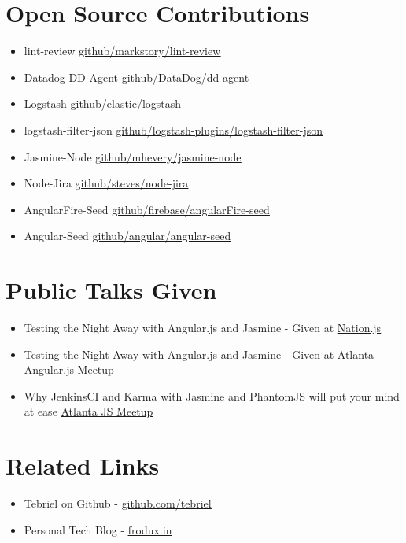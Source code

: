 \documentclass[margin]{res}
\begin{document}
\begin{resume}
\section{Open Source Contributions}
    \begin{itemize}
        \item lint-review
            \href{https://github.com/markstory/lint-review}{\underline{github/markstory/lint-review}}
        \item Datadog DD-Agent
            \href{https://github.com/DataDog/dd-agent}{\underline{github/DataDog/dd-agent}}
        \item Logstash
            \href{https://github.com/elastic/logstash}{\underline{github/elastic/logstash}}
        \item logstash-filter-json
            \href{https://github.com/logstash-plugins/logstash-filter-json}{\underline{github/logstash-plugins/logstash-filter-json}}
        \item Jasmine-Node
            \href{https://github.com/mhevery/jasmine-node}{\underline{github/mhevery/jasmine-node}}
        \item Node-Jira
            \href{https://github.com/steves/node-jira}{\underline{github/steves/node-jira}}
        \item AngularFire-Seed
            \href{https://github.com/firebase/angularFire-seed}{\underline{github/firebase/angularFire-seed}}
        \item Angular-Seed
            \href{https://github.com/angular/angular-seed}{\underline{github/angular/angular-seed}}
    \end{itemize}

\section{Public Talks Given}
    \begin{itemize}
        \item Testing the Night Away with Angular.js and Jasmine - Given at
            \href{http://nationjs.com/}{\underline{Nation.js}}
        \item Testing the Night Away with Angular.js and Jasmine - Given at
            \href{http://www.meetup.com/AngularJS-ATL/}{\underline{Atlanta
            Angular.js Meetup}}
        \item Why JenkinsCI and Karma with Jasmine and PhantomJS will put your
            mind at ease
            \href{http://www.meetup.com/AtlantaJavaScript/}{\underline{Atlanta
            JS Meetup}}
    \end{itemize}

\section{Related Links}
    \begin{itemize}
        \item Tebriel on Github - \href{https://github.com/tebriel}{\underline{github.com/tebriel}}
        \item Personal Tech Blog - \href{http://frodux.in/}{\underline{frodux.in}}
    \end{itemize}

\end{resume}
\end{document}
